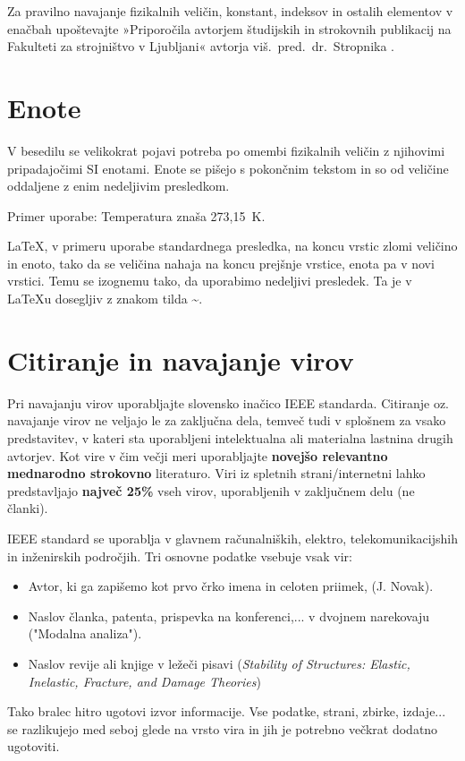 Za pravilno navajanje fizikalnih veličin, konstant, indeksov in ostalih 
elementov v enačbah upoštevajte »Priporočila avtorjem študijskih in strokovnih 
publikacij na Fakulteti za strojništvo v Ljubljani« avtorja 
viš.~pred.~dr.~Stropnika \cite{stropnik_1997}.

\section{Enote}\label{sec:enote}

V besedilu se velikokrat pojavi potreba po omembi fizikalnih veličin z njihovimi pripadajočimi SI enotami.  
Enote se pišejo s pokončnim tekstom in so od veličine oddaljene z enim nedeljivim presledkom.

Primer uporabe: Temperatura znaša 273,15~K.

\LaTeX, v primeru uporabe standardnega presledka, na koncu vrstic zlomi veličino in enoto, tako da se veličina nahaja na koncu prejšnje vrstice, enota pa v novi vrstici. Temu se izognemu tako, da uporabimo nedeljivi presledek. Ta je v \LaTeX u dosegljiv z znakom tilda \textbf{\~}.

\section{Citiranje in navajanje virov}\label{sec:citiranje}

Pri navajanju virov uporabljajte slovensko inačico IEEE standarda. Citiranje 
oz. navajanje virov ne veljajo le za zaključna dela, temveč tudi v splošnem za 
vsako predstavitev, v kateri sta uporabljeni intelektualna ali materialna 
lastnina drugih avtorjev. Kot vire v čim večji meri uporabljajte 
\textbf{novejšo relevantno mednarodno strokovno} literaturo. Viri iz spletnih 
strani/internetni lahko predstavljajo \textbf{največ 25\%} vseh virov, 
uporabljenih v zaključnem delu (ne članki).

IEEE standard se uporablja v glavnem računalniških, elektro, 
telekomunikacijshih in inženirskih področjih. Tri osnovne podatke vsebuje vsak 
vir:
\begin{itemize}
	\item Avtor, ki ga zapišemo kot prvo črko imena in celoten priimek, (J. 
	Novak).
	\item Naslov članka, patenta, prispevka na konferenci,...  v dvojnem 
	narekovaju ("Modalna analiza").
	\item Naslov revije ali knjige v ležeči pisavi (\emph{Stability of 
		Structures: Elastic, Inelastic, Fracture, and Damage Theories})
\end{itemize}
Tako bralec hitro ugotovi izvor informacije. Vse podatke, strani, zbirke, 
izdaje...  se razlikujejo med seboj glede na vrsto vira in jih je potrebno 
večkrat dodatno ugotoviti. 

